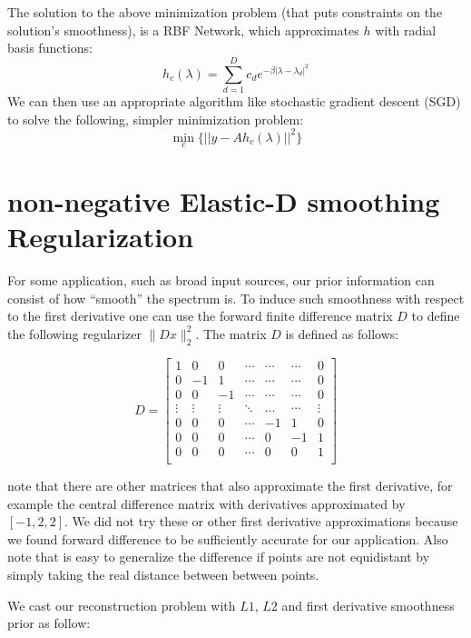 \documentclass[10pt,a4paper]{article}
\begin{document}
The solution to the above minimization problem (that puts constraints on the solution's smoothness), is a RBF Network, which approximates $h$ with radial basis functions:
\begin{equation}
h_c(\lambda) = \sum_{d=1}^D c_d e^{-\beta |\lambda - \lambda_d|^2}
\end{equation}
We can then use an appropriate algorithm like stochastic gradient descent (SGD) to solve the following, simpler minimization problem:
\begin{equation}
\min_c \Big\{ ||y-Ah_c(\lambda)||^2\Big\}
\end{equation}

\section*{non-negative Elastic-D smoothing Regularization}
For some application, such as broad input sources, our prior information can consist of how ``smooth'' the spectrum is. To induce such smoothness with respect to the first derivative one can use the forward finite difference matrix $D$ to define the following regularizer $\| Dx \|^2_2 $. The matrix $D$ is defined as follows:

\[
   D=
  \left[ {\begin{array}{ccccccc}
   1 & 0 & 0 &  \cdots & \cdots & \cdots & 0\\
   0 & -1 & 1 &  \cdots & \cdots & \cdots & 0\\
   0 & 0 & -1 &  \cdots & \cdots & \cdots & 0\\
   \vdots & \vdots & \vdots &  \ddots & \dots & \cdots & \vdots\\
   0 & 0 & 0 &  \cdots & -1 & 1 & 0\\
   0 & 0 & 0 &  \cdots & 0 & -1 & 1\\
   0 & 0 & 0 &  \cdots & 0 & 0 & 1\\
  \end{array} } \right]
\]

note that there are other matrices that also approximate the first derivative, for example the central difference matrix with derivatives approximated by $[-1 , 2 ,2]$. We did not try these or other first derivative approximations because we found forward difference to be sufficiently accurate for our application. Also note that is easy to generalize the difference if points are not equidistant by simply taking the real distance between between points. 

We cast our reconstruction problem with $L1$, $L2$ and first derivative smoothness prior as follow:
\end{document}
